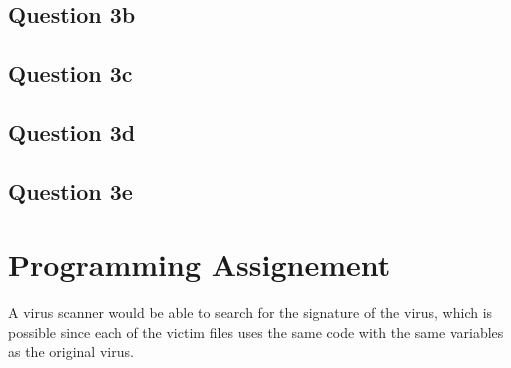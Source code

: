 \documentclass[12pt,a4paper]{article}
\begin{document}
\subsection{Question 3b}
\subsection{Question 3c}
\subsection{Question 3d}
\subsection{Question 3e}

\section{Programming Assignement}
A virus scanner would be able to search for the signature of the virus, which is possible since each of the victim files uses the same code with the same variables as the original virus.
\end{document}
